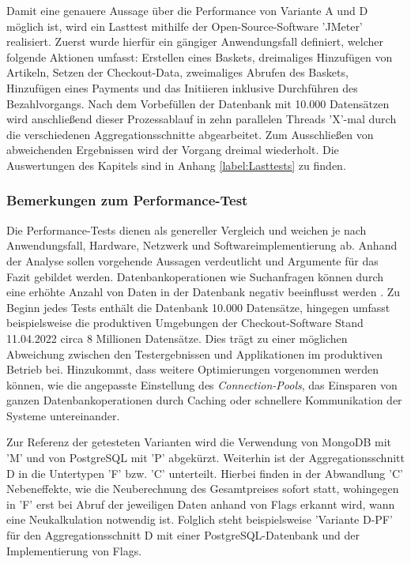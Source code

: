 Damit eine genauere Aussage über die Performance von Variante A und D möglich ist, wird ein Lasttest mithilfe der Open-Source-Software 'JMeter' realisiert. Zuerst wurde hierfür ein gängiger Anwendungsfall definiert, welcher folgende Aktionen umfasst: Erstellen eines Baskets, dreimaliges Hinzufügen von Artikeln, Setzen der Checkout-Data, zweimaliges Abrufen des Baskets, Hinzufügen eines Payments und das Initiieren inklusive Durchführen des Bezahlvorgangs. Nach dem Vorbefüllen der Datenbank mit 10.000 Datensätzen wird anschließend dieser Prozessablauf in zehn parallelen Threads 'X'-mal durch die verschiedenen Aggregationsschnitte abgearbeitet. Zum Ausschließen von abweichenden Ergebnissen wird der Vorgang dreimal wiederholt. Die Auswertungen des Kapitels sind in Anhang \ref{label:Lasttests} zu finden.

\subsubsection{Bemerkungen zum Performance-Test}

Die Performance-Tests dienen als genereller Vergleich und weichen je nach Anwendungsfall, Hardware, Netzwerk und Softwareimplementierung ab. Anhand der Analyse sollen vorgehende Aussagen verdeutlicht und Argumente für das Fazit gebildet werden. Datenbankoperationen wie Suchanfragen können durch eine erhöhte Anzahl von Daten in der Datenbank negativ beeinflusst werden . Zu Beginn jedes Tests enthält die Datenbank 10.000 Datensätze, hingegen umfasst beispielsweise die produktiven Umgebungen der Checkout-Software Stand 11.04.2022 circa 8 Millionen Datensätze. Dies trägt zu einer möglichen Abweichung zwischen den Testergebnissen und Applikationen im produktiven Betrieb bei. Hinzukommt, dass weitere Optimierungen vorgenommen werden können, wie die angepasste Einstellung des \emph{\Gls{Connection-Pool}s}, das Einsparen von ganzen Datenbankoperationen durch Caching oder schnellere Kommunikation der Systeme untereinander. 

Zur Referenz der getesteten Varianten wird die Verwendung von MongoDB mit 'M' und von PostgreSQL mit 'P' abgekürzt. Weiterhin ist der Aggregationsschnitt D in die Untertypen 'F' bzw. 'C' unterteilt. Hierbei finden in der Abwandlung 'C' Nebeneffekte, wie die Neuberechnung des Gesamtpreises sofort statt, wohingegen in 'F' erst bei Abruf der jeweiligen Daten anhand von Flags erkannt wird, wann eine Neukalkulation notwendig ist. Folglich steht beispielsweise 'Variante D-PF' für den Aggregationsschnitt D mit einer PostgreSQL-Datenbank und der Implementierung von Flags.

